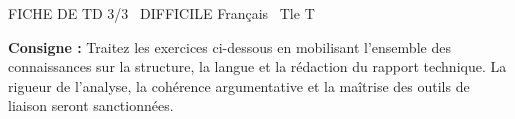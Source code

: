 \documentclass[11pt]{article}
\begin{document}
\begin{tcolorbox}[enhanced,colback=popink,colframe=popink,arc=10pt,boxrule=0pt,left=12pt,right=12pt,top=9pt,bottom=9pt]
{\color{white}\popxbold\small FICHE DE TD 3/3 \textbullet\ DIFFICILE \hfill Français \textbullet\ Tle T\par}
\end{tcolorbox}
\vspace{4pt}
\noindent \textbf{Consigne :} Traitez les exercices ci-dessous en mobilisant l'ensemble des connaissances sur la structure, la langue et la rédaction du rapport technique. La rigueur de l'analyse, la cohérence argumentative et la maîtrise des outils de liaison seront sanctionnées.
\end{document}
